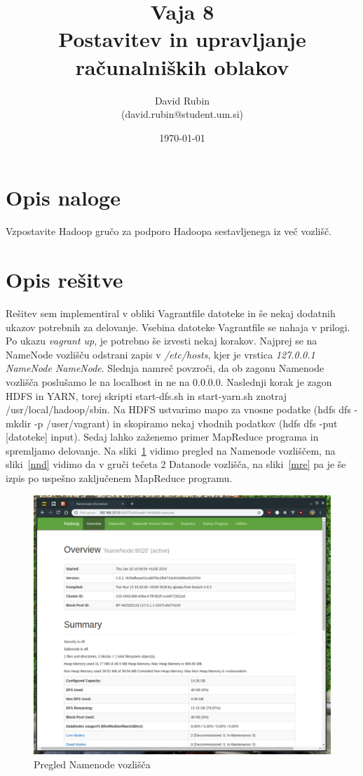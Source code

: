 \documentclass[a4paper,11pt]{article}
\title{%
  Vaja 8\\
  \large Postavitev in upravljanje računalniških oblakov}
\author{David Rubin \\ (david.rubin@student.um.si)}
\date{\today}
\begin{document}
\maketitle

\section{Opis naloge}

Vzpostavite Hadoop gručo za podporo Hadoopa sestavljenega iz več vozlišč.

\section{Opis rešitve}

Rešitev sem implementiral v obliki Vagrantfile datoteke in še nekaj dodatnih ukazov potrebnih za delovanje. Vsebina datoteke Vagrantfile se nahaja v prilogi. Po ukazu \textit{vagrant up}, je potrebno še izvesti nekaj korakov. Najprej se na NameNode vozlišču odstrani zapis v \textit{/etc/hosts}, kjer je vrstica \textit{127.0.0.1 NameNode NameNode}. Slednja namreč povzroči, da ob zagonu Namenode vozlišča poslušamo le na localhost in ne na 0.0.0.0. Naslednji korak je zagon HDFS in YARN, torej skripti start-dfs.sh in start-yarn.sh znotraj /usr/local/hadoop/sbin. Na HDFS ustvarimo mapo za vnosne podatke (hdfs dfs -mkdir -p /user/vagrant) in skopiramo nekaj vhodnih podatkov (hdfs dfs -put [datoteke] input). Sedaj lahko zaženemo primer MapReduce programa in spremljamo delovanje. Na sliki~\ref{nno} vidimo pregled na Namenode vozliščem, na sliki~\ref{nnd} vidimo da v gruči tečeta 2 Datanode vozlišča, na sliki~\ref{mre} pa je še izpis po uspešno zaključenem MapReduce programu.

\begin{figure}
\begin{center}
\includegraphics[scale=0.5]{./namenode-overview.png}
\caption{Pregled Namenode vozlišča}
\label{nno}
\end{center}
\end{figure}
\end{document}
